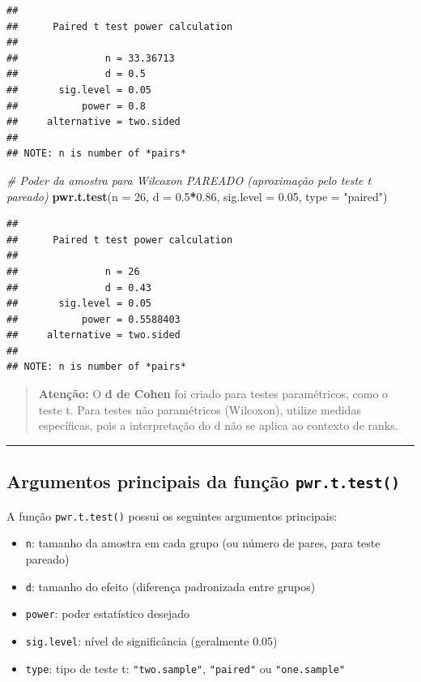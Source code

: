 \documentclass[
]{book}
\newenvironment{Shaded}{\begin{snugshade}}{\end{snugshade}}
\newcommand{\AttributeTok}[1]{\textcolor[rgb]{0.13,0.29,0.53}{#1}}
\newcommand{\CommentTok}[1]{\textcolor[rgb]{0.56,0.35,0.01}{\textit{#1}}}
\newcommand{\DecValTok}[1]{\textcolor[rgb]{0.00,0.00,0.81}{#1}}
\newcommand{\FloatTok}[1]{\textcolor[rgb]{0.00,0.00,0.81}{#1}}
\newcommand{\FunctionTok}[1]{\textcolor[rgb]{0.13,0.29,0.53}{\textbf{#1}}}
\newcommand{\NormalTok}[1]{#1}
\newcommand{\SpecialCharTok}[1]{\textcolor[rgb]{0.81,0.36,0.00}{\textbf{#1}}}
\newcommand{\StringTok}[1]{\textcolor[rgb]{0.31,0.60,0.02}{#1}}
\providecommand{\tightlist}{%
  \setlength{\itemsep}{0pt}\setlength{\parskip}{0pt}}
\begin{document}
\begin{verbatim}
## 
##      Paired t test power calculation 
## 
##               n = 33.36713
##               d = 0.5
##       sig.level = 0.05
##           power = 0.8
##     alternative = two.sided
## 
## NOTE: n is number of *pairs*
\end{verbatim}

\begin{Shaded}
\begin{Highlighting}[]
\CommentTok{\# Poder da amostra para Wilcoxon PAREADO (aproximação pelo teste t pareado)}
\FunctionTok{pwr.t.test}\NormalTok{(}\AttributeTok{n =} \DecValTok{26}\NormalTok{, }\AttributeTok{d =} \FloatTok{0.5}\SpecialCharTok{*}\FloatTok{0.86}\NormalTok{, }\AttributeTok{sig.level =} \FloatTok{0.05}\NormalTok{, }\AttributeTok{type =} \StringTok{"paired"}\NormalTok{)}
\end{Highlighting}
\end{Shaded}

\begin{verbatim}
## 
##      Paired t test power calculation 
## 
##               n = 26
##               d = 0.43
##       sig.level = 0.05
##           power = 0.5588403
##     alternative = two.sided
## 
## NOTE: n is number of *pairs*
\end{verbatim}

\begin{quote}
\textbf{Atenção:} O \textbf{d de Cohen} foi criado para testes paramétricos, como o teste t. Para testes não paramétricos (Wilcoxon), utilize medidas específicas, pois a interpretação do d não se aplica ao contexto de ranks.
\end{quote}

\begin{center}\rule{0.5\linewidth}{0.5pt}\end{center}

\subsection{\texorpdfstring{Argumentos principais da função \texttt{pwr.t.test()}}{Argumentos principais da função pwr.t.test()}}\label{argumentos-principais-da-funuxe7uxe3o-pwr.t.test}

A função \texttt{pwr.t.test()} possui os seguintes argumentos principais:

\begin{itemize}
\tightlist
\item
  \texttt{n}: tamanho da amostra em cada grupo (ou número de pares, para teste pareado)
\item
  \texttt{d}: tamanho do efeito (diferença padronizada entre grupos)
\item
  \texttt{power}: poder estatístico desejado
\item
  \texttt{sig.level}: nível de significância (geralmente 0.05)
\item
  \texttt{type}: tipo de teste t: \texttt{"two.sample"}, \texttt{"paired"} ou \texttt{"one.sample"}
\end{itemize}
\end{document}
